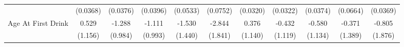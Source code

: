 {\begin{tabular}{l*{10}{c}}
            &    (0.0368)         &    (0.0376)         &    (0.0396)         &    (0.0533)         &    (0.0752)         &    (0.0320)         &    (0.0322)         &    (0.0374)         &    (0.0664)         &    (0.0369)         \\
\addlinespace
Age At First Drink&       0.529         &      -1.288         &      -1.111         &      -1.530         &      -2.844         &       0.376         &      -0.432         &      -0.580         &      -0.371         &      -0.805         \\
            &     (1.156)         &     (0.984)         &     (0.993)         &     (1.440)         &     (1.841)         &     (1.140)         &     (1.119)         &     (1.134)         &     (1.389)         &     (1.876)         \\
\bottomrule
\end{tabular}
}
